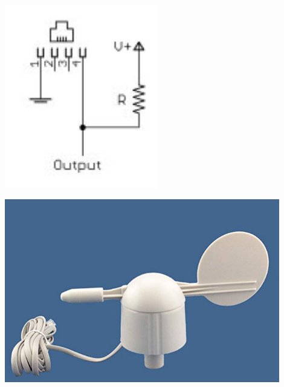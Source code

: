 {\begin{minipage}[b][6cm][t]{0.49\textwidth}
\centering
\includegraphics[width=0.5\textwidth]{graphics/windrichtungsgeber/aeussere_beschaltung.PNG} 
\label{fig:aussere_beschaltung}
\end{minipage}}
{\begin{minipage}[b][6cm][t]{0.49\textwidth}
\centering
\includegraphics[width=0.9\textwidth]{graphics/windrichtungsgeber/windrichtungsgeber.PNG}
\label{fig:windrichtungsgeber}
\end{minipage}}

